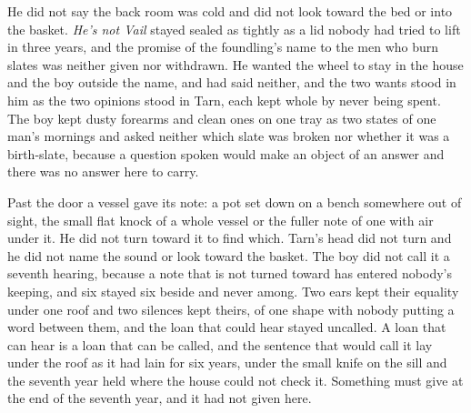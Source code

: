 He did not say the back room was cold and did not look toward the bed or into the basket. \emph{He’s not Vail} stayed sealed as tightly as a lid nobody had tried to lift in three years, and the promise of the foundling’s name to the men who burn slates was neither given nor withdrawn. He wanted the wheel to stay in the house and the boy outside the name, and had said neither, and the two wants stood in him as the two opinions stood in Tarn, each kept whole by never being spent. The boy kept dusty forearms and clean ones on one tray as two states of one man’s mornings and asked neither which slate was broken nor whether it was a birth-slate, because a question spoken would make an object of an answer and there was no answer here to carry.

Past the door a vessel gave its note: a pot set down on a bench somewhere out of sight, the small flat knock of a whole vessel or the fuller note of one with air under it. He did not turn toward it to find which. Tarn’s head did not turn and he did not name the sound or look toward the basket. The boy did not call it a seventh hearing, because a note that is not turned toward has entered nobody’s keeping, and six stayed six beside and never among. Two ears kept their equality under one roof and two silences kept theirs, of one shape with nobody putting a word between them, and the loan that could hear stayed uncalled. A loan that can hear is a loan that can be called, and the sentence that would call it lay under the roof as it had lain for six years, under the small knife on the sill and the seventh year held where the house could not check it. Something must give at the end of the seventh year, and it had not given here.

\scenebreak

